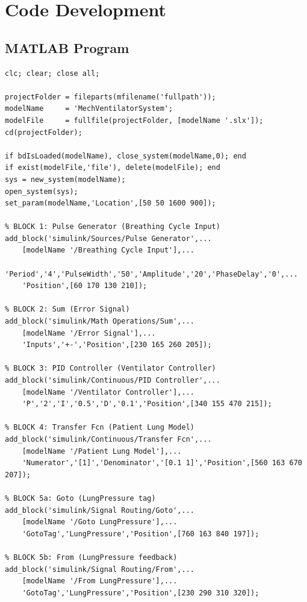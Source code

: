 \documentclass[12pt,a4paper]{article}
\begin{document}
\section{Code Development}

\subsection*{MATLAB Program}

\begin{lstlisting}[style=matlab, caption={Mechanical Ventilator Control System -- MATLAB R2026a}]
%% MECHANICAL VENTILATOR CONTROL SYSTEM
clc; clear; close all;

projectFolder = fileparts(mfilename('fullpath'));
modelName     = 'MechVentilatorSystem';
modelFile     = fullfile(projectFolder, [modelName '.slx']);
cd(projectFolder);

if bdIsLoaded(modelName), close_system(modelName,0); end
if exist(modelFile,'file'), delete(modelFile); end
sys = new_system(modelName);
open_system(sys);
set_param(modelName,'Location',[50 50 1600 900]);

% BLOCK 1: Pulse Generator (Breathing Cycle Input)
add_block('simulink/Sources/Pulse Generator',...
    [modelName '/Breathing Cycle Input'],...
    'Period','4','PulseWidth','50','Amplitude','20','PhaseDelay','0',...
    'Position',[60 170 130 210]);

% BLOCK 2: Sum (Error Signal)
add_block('simulink/Math Operations/Sum',...
    [modelName '/Error Signal'],...
    'Inputs','+-','Position',[230 165 260 205]);

% BLOCK 3: PID Controller (Ventilator Controller)
add_block('simulink/Continuous/PID Controller',...
    [modelName '/Ventilator Controller'],...
    'P','2','I','0.5','D','0.1','Position',[340 155 470 215]);

% BLOCK 4: Transfer Fcn (Patient Lung Model)
add_block('simulink/Continuous/Transfer Fcn',...
    [modelName '/Patient Lung Model'],...
    'Numerator','[1]','Denominator','[0.1 1]','Position',[560 163 670 207]);

% BLOCK 5a: Goto (LungPressure tag)
add_block('simulink/Signal Routing/Goto',...
    [modelName '/Goto LungPressure'],...
    'GotoTag','LungPressure','Position',[760 163 840 197]);

% BLOCK 5b: From (LungPressure feedback)
add_block('simulink/Signal Routing/From',...
    [modelName '/From LungPressure'],...
    'GotoTag','LungPressure','Position',[230 290 310 320]);


\end{lstlisting}
\end{document}
